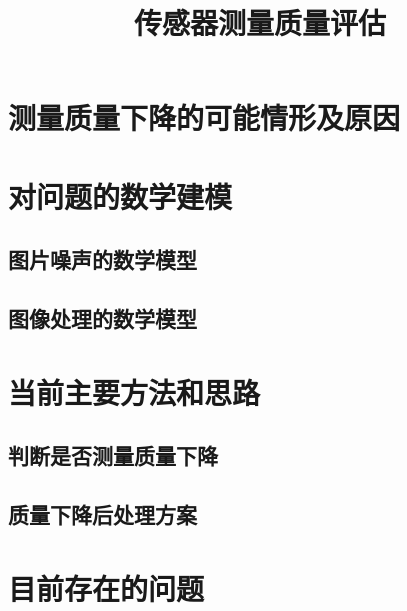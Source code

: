 \message{ !name(0625传感器测量质量评估.tex)}\documentclass{beamer}
\title{传感器测量质量评估}
\begin{document}


\maketitle
\tableofcontents

\section{测量质量下降的可能情形及原因}
\begin{frame}
  \begin{block}

  \end{block}
\end{frame}

\section{对问题的数学建模}

\subsection{图片噪声的数学模型}

\begin{frame}

\end{frame}

\begin{frame}

\end{frame}

\subsection{图像处理的数学模型}

\section{当前主要方法和思路}
\subsection{判断是否测量质量下降}

\subsection{质量下降后处理方案}


\section{目前存在的问题}
\begin{frame}

\end{frame}
\end{document}
